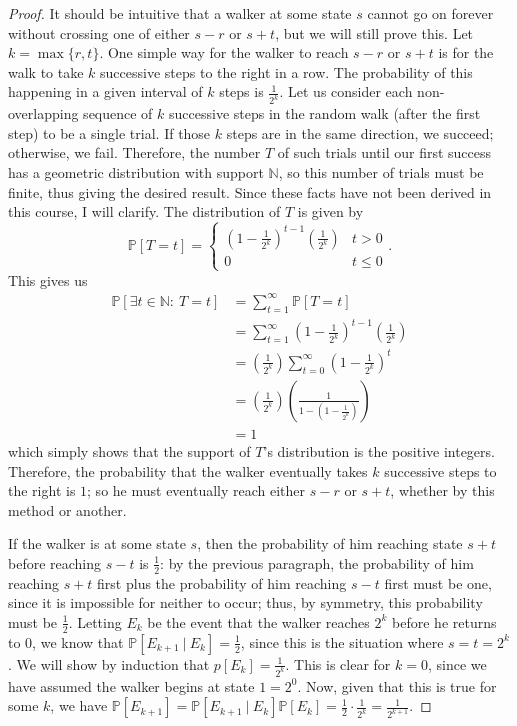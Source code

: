 \documentclass[12pt]{article}
\newcommand{\N}{\mathbb{N}}
\newcommand{\p}{\mathbb{P}}
\begin{document}
\begin{enumerate}[leftmargin=0cm,itemindent=.5cm,labelwidth=\itemindent,labelsep=0cm,align=left]
\begin{proof}
It should be intuitive that a walker at some state $s$ cannot go on forever without crossing one of either $s-r$ or $s+t$, but we will still prove this.  Let $k = \max \{r,t\}$.  One simple way for the walker to reach $s-r$ or $s+t$ is for the walk to take $k$ successive steps to the right in a row.  The probability of this happening in a given interval of $k$ steps is $\frac{1}{2^k}$.  Let us consider each non-overlapping sequence of $k$ successive steps in the random walk (after the first step) to be a single trial.  If those $k$ steps are in the same direction, we succeed; otherwise, we fail.  Therefore, the number $T$ of such trials until our first success has a geometric distribution with support $\N$, so this number of trials must be finite, thus giving the desired result.  Since these facts have not been derived in this course, I will clarify.  The distribution of $T$ is given by
$$
\p[T = t] =
\begin{cases}
\left( 1-\frac{1}{2^k} \right)^{t-1}\left( \frac{1}{2^k} \right) & t > 0
\\
0 & t \leq 0
\end{cases}.
$$
This gives us
\begin{align*}
\p[\exists t\in\N : \ T = t] &= \sum_{t=1}^\infty \p[T=t]
\\
&= \sum_{t=1}^\infty \left( 1-\frac{1}{2^k} \right)^{t-1}\left( \frac{1}{2^k} \right)
\\
&= \left( \frac{1}{2^k} \right)\sum_{t=0}^\infty \left( 1-\frac{1}{2^k} \right)^{t}
\\
&= \left( \frac{1}{2^k} \right)\left(\frac{1}{1 - (1 - \frac{1}{2^k})}\right)
\\
&= 1
\end{align*}
which simply shows that the support of $T$'s distribution is the positive integers.  Therefore, the probability that the walker eventually takes $k$ successive steps to the right is $1$; so he must eventually reach either $s-r$ or $s+t$, whether by this method or another.

If the walker is at some state $s$, then the probability of him reaching state $s+t$ before reaching $s-t$ is $\frac12$: by the previous paragraph, the probability of him reaching $s+t$ first plus the probability of him reaching $s-t$ first must be one, since it is impossible for neither to occur; thus, by symmetry, this probability must be $\frac12$.  Letting $E_k$ be the event that the walker reaches $2^k$ before he returns to $0$, we know that $\p[E_{k+1} \ | \ E_k] = \frac12$, since this is the situation where $s=t=2^k$.  We will show by induction that $p[E_k] = \frac{1}{2^k}$.  This is clear for $k=0$, since we have assumed the walker begins at state $1 = 2^0$.  Now, given that this is true for some $k$, we have $\p[E_{k+1}] = \p[E_{k+1} \ | \ E_k]\p[E_k] = \frac12 \cdot \frac{1}{2^k} = \frac{1}{2^{k+1}}$.


\end{proof}
\end{enumerate}
\end{document}
